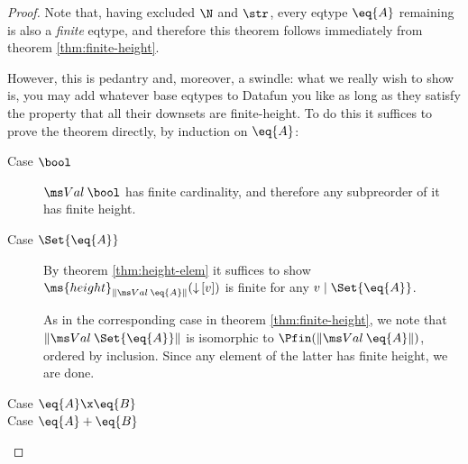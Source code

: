 \documentclass{article}
\newcommand{\widevec}[1]{\overrightarrow{#1}}
\newcommand{\eqposet}[1]{\ms{Eq}(#1)}
\renewcommand{\eqposet}[1]{\|{#1}\|}
\newcommand{\eqclass}[1]{[#1]}
\newcommand{\height}{\ms{height}}
\newcommand{\down}[1]{{\mathop{\downarrow}{#1}}}
\newcommand{\lr}[2]{#2\mathrel{|}#1}
\begin{document}
\begin{proof}
  Note that, having excluded $\N$ and $\str$, every eqtype $\eq{A}$ remaining is
  also a \emph{finite} eqtype, and therefore this theorem follows immediately
  from theorem \ref{thm:finite-height}.

  However, this is pedantry and, moreover, a swindle: what we really wish to
  show is, you may add whatever base eqtypes to Datafun you like as long as they
  satisfy the property that all their downsets are finite-height. To do this it
  suffices to prove the theorem directly, by induction on $\eq{A}$:
  \begin{description}
  \item[Case $\bool$] $\Val{\bool}$ has finite cardinality, and therefore any
    subpreorder of it has finite height.

  \item[Case $\Set{\eq{A}}$] By theorem \ref{thm:height-elem} it suffices to
    show $\height_{\eqposet{\Val{\eq{A}}}}(\down{\eqclass{v}})$ is finite for
    any $\lr{\Set{\eq{A}}}{v}$.

    As in the corresponding case in theorem \ref{thm:finite-height}, we note
    that $\eqposet{\Val{\Set{\eq{A}}}}$ is isomorphic to
    $\Pfin(\eqposet{\Val{\eq{A}}})$, ordered by inclusion. Since any element of
    the latter has finite height, we are done.



  \item[Case $\eq{A} \x \eq{B}$] \TODO
  \item[Case $\eq{A} + \eq{B}$] \TODO
  \end{description}
\end{proof}
\end{document}
